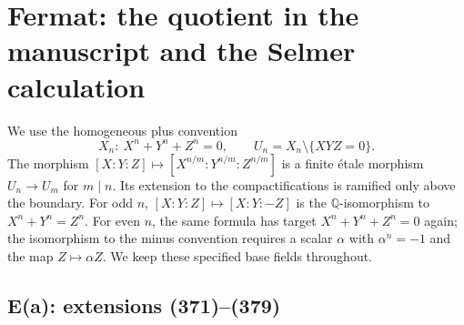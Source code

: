\documentclass[11pt,oneside]{article}
\begin{document}
\section{Fermat: the quotient in the manuscript and the Selmer calculation}
\label{sec:E}
We use the homogeneous plus convention
\[
 X_n:\ X^n+Y^n+Z^n=0,\qquad U_n=X_n\setminus\{XYZ=0\}.
\]
The morphism $[X:Y:Z]\mapsto[X^{n/m}:Y^{n/m}:Z^{n/m}]$
is a finite étale morphism $U_n\to U_m$ for $m\mid n$.
Its extension to the compactifications is ramified only above the
boundary. For odd $n$, $[X:Y:Z]\mapsto[X:Y:-Z]$ is the
$\mathbb Q$-isomorphism to $X^n+Y^n=Z^n$. For even $n$,
the same formula has target $X^n+Y^n+Z^n=0$ again; the
isomorphism to the minus convention requires a scalar
$\alpha$ with $\alpha^n=-1$ and the map $Z\mapsto\alpha Z$.
We keep these specified base fields throughout.

\subsection{E(a): extensions (371)--(379)}
\end{document}
